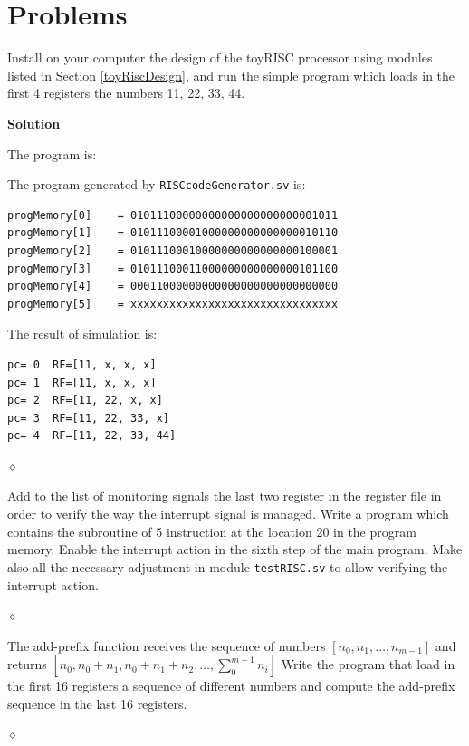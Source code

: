 \section{Problems}

\begin{problem}
Install on your computer the design of the toyRISC processor using modules listed in Section \ref{toyRiscDesign}, and run the simple program which loads in the first 4 registers the numbers 11, 22, 33, 44.



{\bf Solution}

The program is:

The program generated by {\tt RISCcodeGenerator.sv} is:
{\small
\begin{verbatim}
progMemory[0]    = 01011100000000000000000000001011
progMemory[1]    = 01011100001000000000000000010110
progMemory[2]    = 01011100010000000000000000100001
progMemory[3]    = 01011100011000000000000000101100
progMemory[4]    = 00011000000000000000000000000000
progMemory[5]    = xxxxxxxxxxxxxxxxxxxxxxxxxxxxxxxx
\end{verbatim}
}
The result of simulation is:
{\small
\begin{verbatim}
pc= 0  RF=[11, x, x, x]
pc= 1  RF=[11, x, x, x]
pc= 2  RF=[11, 22, x, x]
pc= 3  RF=[11, 22, 33, x]
pc= 4  RF=[11, 22, 33, 44]
\end{verbatim}
}

$\diamond$
\end{problem}

\begin{problem}
Add to the list of monitoring signals the last two register in the register file in order to verify the way the interrupt signal is managed. Write a program which contains the subroutine of 5 instruction at the location 20 in the program memory. Enable the interrupt action in the sixth step of the main program. Make also all the necessary adjustment in module {\tt testRISC.sv} to allow verifying the interrupt action.

$\diamond$
\end{problem}


\begin{problem}
The add-prefix function receives the sequence of numbers $[n_0, n_1, \ldots, n_{m-1}]$ and returns $[n_0, n_0 + n_1, n_0 + n_1 + n_2, \ldots, \sum_0^{m-1} n_i]$
Write the program that load in the first 16 registers a sequence of different numbers and compute the add-prefix sequence in the last 16 registers.

$\diamond$
\end{problem}


